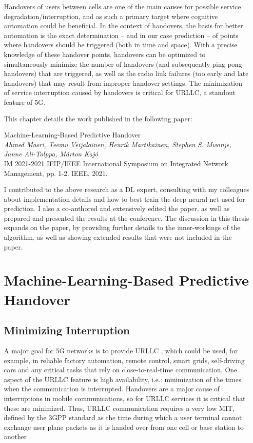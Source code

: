 	Handovers of users between cells are one of the main causes for possible service degradation/interruption, and as such a primary target where cognitive automation could be beneficial.
	In the context of handovers, the basis for better automation is the exact determination -- and in our case prediction -- of points where handovers should be triggered (both in time and space).
	With a precise knowledge of these handover points, handovers can be optimized to simultaneously minimize the number of handovers (and subsequently ping pong handovers) that are triggered, as well as the radio link failures (too early and late handovers) that may result from improper handover settings.
	The minimization of service interruption caused by handovers is critical for \ac{URLLC}, a standout feature of 5G.
	
	This chapter details the work published in the following paper:
	
	\begin{publication}
		Machine-Learning-Based Predictive Handover \\
		\textit{Ahmed Masri, Teemu Veijalainen, Henrik Martikainen, Stephen S. Mwanje, Janne Ali-Tolppa, Márton Kajó} \\
		IM 2021-2021 IFIP/IEEE International Symposium on Integrated Network Management, pp. 1-2. IEEE, 2021.
	\end{publication}

	I contributed to the above research as a \ac{DL} expert, consulting with my colleagues about implementation details and how to best train the deep neural net used for prediction. 
	I also a co-authored and extensively edited the paper, as well as prepared and presented the results at the conference.
	The discussion in this thesis expands on the paper, by providing further details to the inner-workings of the algorithm, as well as showing extended results that were not included in the paper.
	
	\section{Machine-Learning-Based Predictive Handover}
		\label{cha:pred_ho:ml_based_pred_ho}
		
		\subsection{Minimizing Interruption}
		
			A major goal for \ac{5G} networks is to provide \ac{URLLC} \cite{pred_hoinnr}, which could be used, for example, in reliable factory automation, remote control, smart grids, self-driving cars and any critical tasks that rely on close-to-real-time communication. 
			One aspect of the \ac{URLLC} feature is high availability, i.e.: minimization of the times when the communication is interrupted. 
			Handovers are a major cause of interruptions in mobile communications, so for \ac{URLLC} services it is critical that these are minimized.		
			Thus, \ac{URLLC} communication requires a very low \ac{MIT}, defined by the \ac{3GPP} standard as the time during which a user terminal cannot exchange user plane packets as it is handed over from one cell or base station to another \cite{pred_studyonscenarios}.
			
